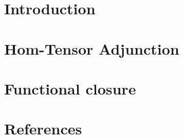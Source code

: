 

%









	\begin{frame}
		\titlepage
	\end{frame}
	
	\section{Introduction}
	
	
	\section{Hom-Tensor Adjunction}	
		

	\section{Functional closure}	
		
	
	\section{References}
	
	
